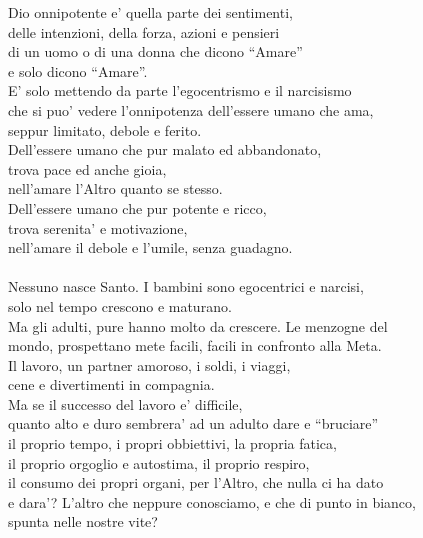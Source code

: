 \begin{haiku}
    Dio onnipotente e' quella parte dei sentimenti,\\
    delle intenzioni, della forza, azioni e pensieri\\
    di un uomo o di una donna che dicono ``Amare'' \\
    e solo dicono ``Amare''.\\
    E' solo mettendo da parte l'egocentrismo e il narcisismo\\
    che si puo' vedere l'onnipotenza dell'essere umano che ama,\\
    seppur limitato, debole e ferito.\\
    Dell'essere umano che pur malato ed abbandonato, \\
    trova pace ed anche gioia, \\
    nell'amare l'Altro quanto se stesso.\\
    Dell'essere umano che pur potente e ricco,\\
    trova serenita' e motivazione,\\
    nell'amare il debole e l'umile, senza guadagno.\\
    \leavevmode\\
    Nessuno nasce Santo. I bambini sono egocentrici e narcisi,\\
    solo nel tempo crescono e maturano.\\
    Ma gli adulti, pure hanno molto da crescere. Le menzogne del\\
    mondo, prospettano mete facili, facili in confronto alla Meta.\\
    Il lavoro, un partner amoroso, i soldi, i viaggi,\\
    cene e divertimenti in compagnia. \\
    Ma se il successo del lavoro e' difficile,\\
    quanto alto e duro sembrera' ad un adulto dare e ``bruciare''\\
    il proprio tempo, i propri obbiettivi, la propria fatica,\\
    il proprio orgoglio e autostima, il proprio respiro,\\
    il consumo dei propri organi, per l'Altro, che nulla ci ha dato\\
    e dara'? L'altro che neppure conosciamo, e che di punto in bianco,\\
    spunta nelle nostre vite?\\

\end{haiku}
